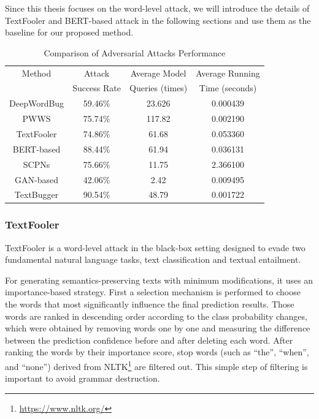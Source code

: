 Since this thesis focuses on the word-level attack, we will introduce the details of TextFooler and BERT-based attack in the following sections and use them as the baseline for our proposed method.

\begin{table}[h]
  \footnotesize
  \centering
  \begin{tabular}{|c||c|c|c|}
    \hline
    Method & Attack  & Average Model  & Average Running \\
           & Success Rate & Queries (times) & Time (seconds) \\
    \hline \hline
    DeepWordBug & 59.46\% & 23.626 & 0.000439 \\
   
    PWWS & 75.74\% & 117.82 & 0.002190 \\
   
    TextFooler & 74.86\% & 61.68 & 0.053360 \\
   
    BERT-based & 88.44\% & 61.94 & 0.036131 \\
   
    SCPNs & 75.66\% & 11.75 & 2.366100 \\
   
    GAN-based & 42.06\% & 2.42 & 0.009495 \\
   
    TextBugger & 90.54\% & 48.79 & 0.001722 \\
    \hline
  \end{tabular}
  \caption{Comparison of Adversarial Attacks Performance \cite{QIU2022278}}
\label{tab:2_2_attack-performance}
\end{table}


\subsubsection{TextFooler}\label{subsubsec:textfooler}

TextFooler \cite{journals/corr/abs-1907-11932} is  a word-level attack in the black-box setting designed to evade two fundamental natural language tasks, text classification and textual entailment. 

For generating semantics-preserving texts with minimum modifications, it uses an importance-based strategy. First a selection mechanism is performed to choose the words that most significantly influence the final prediction results. Those words are ranked in descending order according to the class probability changes, which were obtained by removing words one by one and measuring the difference between the prediction confidence before and after deleting each word.
After ranking the words by their importance score, stop words (such as “the”, “when”, and “none”) derived from NLTK\footnote{\url{https://www.nltk.org/}} are filtered out. This simple step of filtering is important to avoid grammar destruction.

